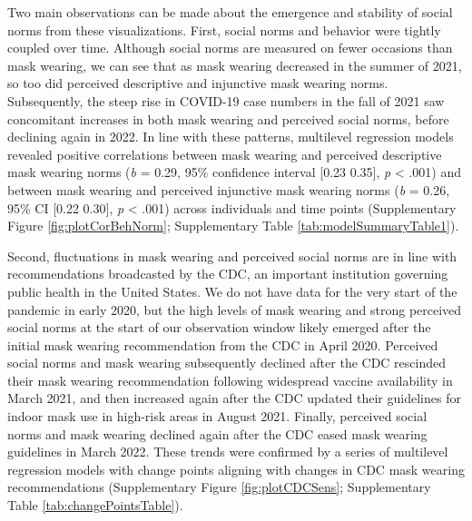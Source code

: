 \documentclass[
  man, donotrepeattitle,floatsintext]{apa6}
\begin{document}
Two main observations can be made about the emergence and stability of social norms from these visualizations. First, social norms and behavior were tightly coupled over time. Although social norms are measured on fewer occasions than mask wearing, we can see that as mask wearing decreased in the summer of 2021, so too did perceived descriptive and injunctive mask wearing norms. Subsequently, the steep rise in COVID-19 case numbers in the fall of 2021 saw concomitant increases in both mask wearing and perceived social norms, before declining again in 2022. In line with these patterns, multilevel regression models revealed positive correlations between mask wearing and perceived descriptive mask wearing norms (\emph{b} = 0.29, 95\% confidence interval {[}0.23 0.35{]}, \emph{p} \textless{} .001) and between mask wearing and perceived injunctive mask wearing norms (\emph{b} = 0.26, 95\% CI {[}0.22 0.30{]}, \emph{p} \textless{} .001) across individuals and time points (Supplementary Figure \ref{fig:plotCorBehNorm}; Supplementary Table \ref{tab:modelSummaryTable1}).

Second, fluctuations in mask wearing and perceived social norms are in line with recommendations broadcasted by the CDC, an important institution governing public health in the United States. We do not have data for the very start of the pandemic in early 2020, but the high levels of mask wearing and strong perceived social norms at the start of our observation window likely emerged after the initial mask wearing recommendation from the CDC in April 2020. Perceived social norms and mask wearing subsequently declined after the CDC rescinded their mask wearing recommendation following widespread vaccine availability in March 2021, and then increased again after the CDC updated their guidelines for indoor mask use in high-risk areas in August 2021. Finally, perceived social norms and mask wearing declined again after the CDC eased mask wearing guidelines in March 2022. These trends were confirmed by a series of multilevel regression models with change points aligning with changes in CDC mask wearing recommendations (Supplementary Figure \ref{fig:plotCDCSens}; Supplementary Table \ref{tab:changePointsTable}).
\end{document}
